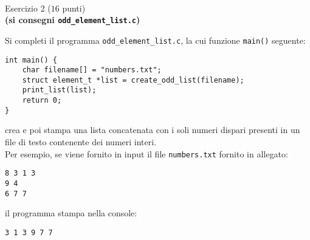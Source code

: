 \documentclass[12pt]{article}
\begin{document}
\pagebreak
\mbox{}\\
\begin{center}{\Large Esercizio 2} ($16$ punti)\\
  \textbf{(si consegni \texttt{odd\_element\_list.c})}
\end{center}
Si completi il programma \texttt{odd\_element\_list.c}, la cui funzione \texttt{main()} seguente:

\begin{center}
  \begin{lstlisting}[language=myC]
int main() {
    char filename[] = "numbers.txt";
    struct element_t *list = create_odd_list(filename);
    print_list(list);
    return 0;
}
  \end{lstlisting}
\end{center}
crea e poi stampa una lista concatenata con i soli numeri dispari presenti in un file di testo contenente dei numeri interi.
\\
Per esempio, se viene fornito in input il file \texttt{numbers.txt} fornito in allegato:

\begin{mdframed}[backgroundcolor=verylightgray] 
\begin{verbatim}
8 3 1 3
9 4
6 7 7
\end{verbatim}
\end{mdframed}
il programma stampa nella console:
\begin{mdframed}[backgroundcolor=verylightgray] 
\begin{verbatim}
3 1 3 9 7 7
\end{verbatim}
\end{mdframed}
\end{document}

